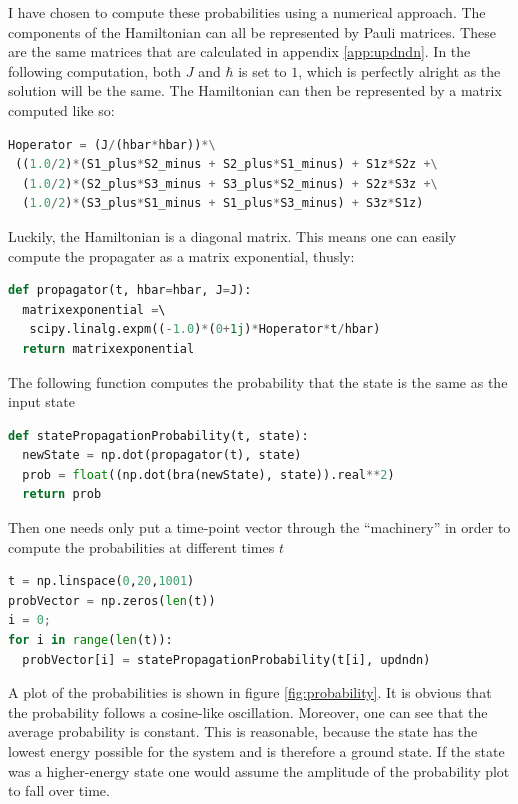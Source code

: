 \documentclass{article}
\begin{document}
I have chosen to compute these probabilities using a numerical approach. The components of the Hamiltonian can all be represented by Pauli matrices. These are the same matrices that are calculated in appendix \ref{app:updndn}. In the following computation, both $J$ and $\hbar$ is set to $1$, which is perfectly alright as the solution will be the same. The Hamiltonian can then be represented by a matrix computed like so:
\begin{lstlisting}[language=Python]
Hoperator = (J/(hbar*hbar))*\
 ((1.0/2)*(S1_plus*S2_minus + S2_plus*S1_minus) + S1z*S2z +\
  (1.0/2)*(S2_plus*S3_minus + S3_plus*S2_minus) + S2z*S3z +\
  (1.0/2)*(S3_plus*S1_minus + S1_plus*S3_minus) + S3z*S1z)
\end{lstlisting}
Luckily, the Hamiltonian is a diagonal matrix. This means one can easily compute the propagater as a matrix exponential, thusly:
\begin{lstlisting}[language=Python]
def propagator(t, hbar=hbar, J=J):
  matrixexponential =\ 
   scipy.linalg.expm((-1.0)*(0+1j)*Hoperator*t/hbar)
  return matrixexponential
\end{lstlisting}
The following function computes the probability that the state is the same as the input state
\begin{lstlisting}[language=Python]
def statePropagationProbability(t, state):
  newState = np.dot(propagator(t), state)
  prob = float((np.dot(bra(newState), state)).real**2)
  return prob
\end{lstlisting}
Then one needs only put a time-point vector through the ``machinery'' in order to compute the probabilities at different times $t$
\begin{lstlisting}[language=Python]
t = np.linspace(0,20,1001)
probVector = np.zeros(len(t))
i = 0;
for i in range(len(t)):
  probVector[i] = statePropagationProbability(t[i], updndn)
\end{lstlisting}
A plot of the probabilities is shown in figure \ref{fig:probability}. It is obvious that the probability follows a cosine-like oscillation. Moreover, one can see that the average probability is constant. This is reasonable, because the state has the lowest energy possible for the system and is therefore a ground state. If the state was a higher-energy state one would assume the amplitude of the probability plot to fall over time.
\end{document}
